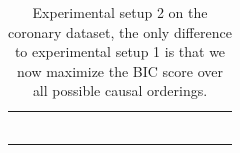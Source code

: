 \documentclass{tufte-book}
\begin{document}
\begin{table}[]
\begin{tabular}{cccccccccccccccc}
                        &                                                                                                  &                                 &                              &                             &                              &                             &                              &                             &                              &                             &                                       &  &  &  &  \\
                        &                                                                                                  &                                 &                              &                             &                              &                             &                              &                             &                              &                             &                                       &  &  &  &  \\
                        &                                                                                                  &                                 &                              &                             &                              &                             &                              &                             &                              &                             &                                       &  &  &  &  \\
                        &                                                                                                  &                                 &                              &                             &                              &                             &                              &                             &                              &                             &                                       &  &  &  &  \\
                        &                                                                                                  &                                 &                              &                             &                              &                             &                              &                             &                              &                             &                                       &  &  &  &  \\
                        &                                                                                                  &                                 &                              &                             &                              &                             &                              &                             &                              &                             &                                       &  &  &  & 

\caption{Experimental setup 2 on the coronary dataset, the only difference to experimental setup 1 is that we now maximize the BIC score over all possible causal orderings.}
			\end{tabular}
\end{table}
\end{document}
